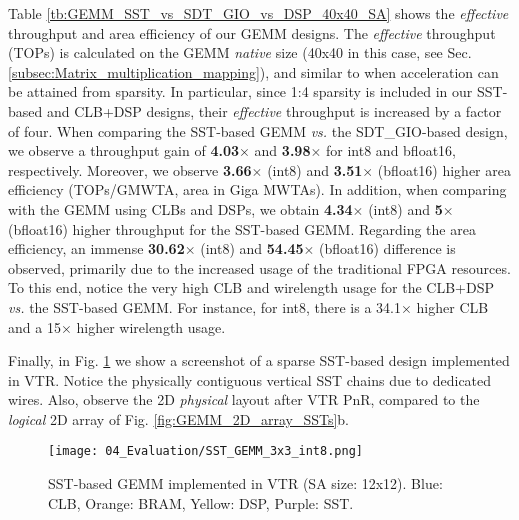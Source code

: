 Table \ref{tb:GEMM_SST_vs_SDT_GIO_vs_DSP_40x40_SA} shows the \textit{effective} throughput and area efficiency of our GEMM designs.
The \textit{effective} throughput (TOPs) is calculated on the GEMM \textit{native} size (40x40 in this case, see Sec. \ref{subsec:Matrix_multiplication_mapping}), and similar to \cite{Nvidia_accelerate_sparse_2021, NVIDIA_A100, AMD_CDNA_3} when acceleration can be attained from sparsity.
In particular, since 1:4 sparsity is included in our SST-based and CLB+DSP designs, their \textit{effective} throughput is increased by a factor of four.
When comparing the SST-based GEMM \emph{vs.} the SDT\_GIO-based design, we observe a throughput gain of \textbf{4.03$\times$} and \textbf{3.98$\times$} for int8 and bfloat16, respectively.
Moreover, we observe \textbf{3.66$\times$} (int8) and \textbf{3.51$\times$} (bfloat16) higher area efficiency (TOPs/GMWTA, area in Giga MWTAs).
In addition, when comparing with the GEMM using CLBs and DSPs, we obtain \textbf{4.34$\times$} (int8) and \textbf{5$\times$} (bfloat16) higher throughput for the SST-based GEMM.
Regarding the area efficiency, an immense \textbf{30.62$\times$} (int8) and \textbf{54.45$\times$} (bfloat16) difference is observed, primarily due to the increased usage
of the traditional FPGA resources.
To this end, notice the very high CLB and wirelength usage for the CLB+DSP \emph{vs.} the SST-based GEMM. 
For instance, for int8, there is a 34.1$\times$ higher CLB and a 15$\times$ higher wirelength usage.


Finally, in Fig. \ref{fig:GEMM_SST_3x3_int8} we show a screenshot of a sparse SST-based design implemented in VTR.
Notice the physically contiguous vertical SST chains due to dedicated wires.
Also, observe the 2D \textit{physical} layout after VTR PnR, compared to the \textit{logical} 2D array of Fig. \ref{fig:GEMM_2D_array_SSTs}b.


\begin{figure}[t]
\vspace{-0.30cm}
\centering
\texttt{[image: 04\_Evaluation/SST\_GEMM\_3x3\_int8.png]}

\vspace{-0.3cm}

\caption{SST-based GEMM implemented in VTR (SA size: 12x12). Blue: CLB, Orange: BRAM, Yellow: DSP, Purple: SST.}
\label{fig:GEMM_SST_3x3_int8}

\vspace{-0.50cm}

\end{figure}







